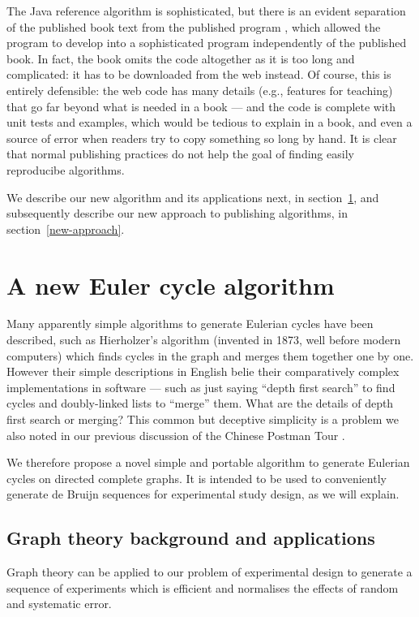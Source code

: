 \documentclass[12pt]{article}
\begin{document}
The Java reference algorithm is sophisticated, but there is an evident separation of the published book text \cite{sedgewickbook} from the published program \cite{sedgewickcode}, which allowed the program to develop into a sophisticated program independently of the published book. In fact, the book \cite{sedgewickcode} omits the code altogether as it is too long and complicated: it has to be downloaded from the web instead. Of course, this is entirely defensible: the web code has many details (e.g., features for teaching) that go far beyond what is needed in a book --- and the code is complete with unit tests and examples, which would be tedious to explain in a book, and even a source of error when readers try to copy something so long by hand. It is clear that normal publishing practices do not help the goal of finding easily reproducibe algorithms. 

We describe our new algorithm and its applications next, in section~\ref{new-algorithm}, and subsequently describe our new approach to publishing algorithms, in section~\ref{new-approach}.

\section{A new Euler cycle algorithm}\label{new-algorithm}
Many apparently simple algorithms to generate Eulerian cycles have been described, such as Hierholzer's algorithm \cite{hierholzer} (invented in 1873, well before modern computers) which finds cycles in the graph and merges them together one by one. However their simple descriptions in English belie their comparatively complex implementations in software --- such as just saying ``depth first search'' to find cycles and doubly-linked lists to ``merge'' them. What are the details of depth first search or merging? This common but deceptive simplicity is a problem we also noted in our previous discussion of the Chinese Postman Tour \cite{cpp}. 

We therefore propose a novel simple and portable algorithm to generate Eulerian cycles on directed complete graphs. It is intended to be used to conveniently generate de Bruijn sequences for experimental study design, as we will explain. 

\subsection{Graph theory background and applications}\label{graphtheory}
Graph theory can be applied to our problem of experimental design to generate a sequence of experiments which is efficient and normalises the effects of random and systematic error.
\end{document}
